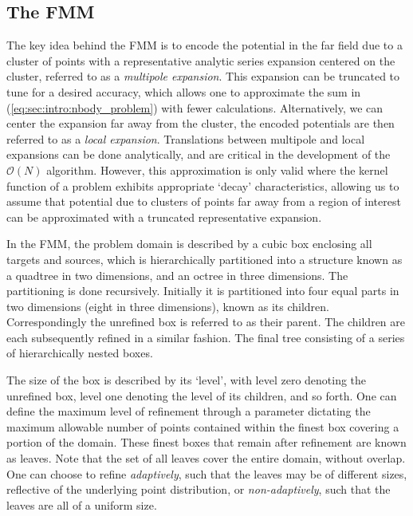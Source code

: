 \documentclass{IEEEcsmag}
\begin{document}
\subsection{The FMM}\label{sec:intro:algorithm}

The key idea behind the FMM is to encode the potential in the far field due to a cluster of points with a representative analytic series expansion centered on the cluster, referred to as a \textit{multipole expansion}. This expansion can be truncated to tune for a desired accuracy, which allows one to approximate the sum in (\ref{eq:sec:intro:nbody_problem}) with fewer calculations. Alternatively, we can center the expansion far away from the cluster, the encoded potentials are then referred to as a \textit{local expansion}. Translations between multipole and local expansions can be done analytically, and are critical in the development of the $\mathcal{O}(N)$ algorithm. However, this approximation is only valid where the kernel function of a problem exhibits appropriate `decay' characteristics, allowing us to assume that potential due to clusters of points far away from a region of interest can be approximated with a truncated representative expansion.

In the FMM, the problem domain is described by a cubic box enclosing all targets and sources, which is hierarchically partitioned into a structure known as a quadtree in two dimensions, and an octree in three dimensions. The partitioning is done recursively. Initially it is partitioned into four equal parts in two dimensions (eight in three dimensions), known as its children. Correspondingly the unrefined box is referred to as their parent. The children are each subsequently refined in a similar fashion. The final tree consisting of a series of hierarchically nested boxes.

The size of the box is described by its `level', with level zero denoting the unrefined box, level one denoting the level of its children, and so forth. One can define the maximum level of refinement through a parameter dictating the maximum allowable number of points contained within the finest box covering a portion of the domain. These finest boxes that remain after refinement are known as leaves. Note that the set of all leaves cover the entire domain, without overlap. One can choose to refine \textit{adaptively}, such that the leaves may be of different sizes, reflective of the underlying point distribution, or \textit{non-adaptively}, such that the leaves are all of a uniform size.
\end{document}
